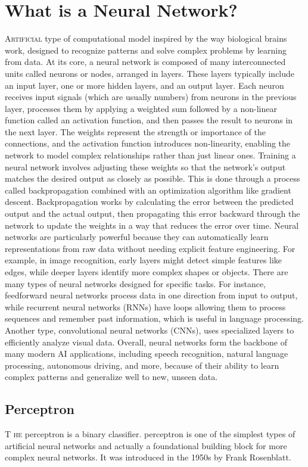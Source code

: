 \documentclass{book}
\begin{document}
\section{What is a Neural Network?}
\lettrine{A}{rtificial} type of computational model inspired by the way biological brains work, designed to recognize patterns and solve complex problems by learning from data. At its core, a neural network is composed of many interconnected units called neurons or nodes, arranged in layers. These layers typically include an input layer, one or more hidden layers, and an output layer.
Each neuron receives input signals (which are usually numbers) from neurons in the previous layer, processes them by applying a weighted sum followed by a non-linear function called an activation function, and then passes the result to neurons in the next layer. The weights represent the strength or importance of the connections, and the activation function introduces non-linearity, enabling the network to model complex relationships rather than just linear ones.
Training a neural network involves adjusting these weights so that the network’s output matches the desired output as closely as possible. This is done through a process called backpropagation combined with an optimization algorithm like gradient descent. Backpropagation works by calculating the error between the predicted output and the actual output, then propagating this error backward through the network to update the weights in a way that reduces the error over time.
Neural networks are particularly powerful because they can automatically learn representations from raw data without needing explicit feature engineering. For example, in image recognition, early layers might detect simple features like edges, while deeper layers identify more complex shapes or objects.
There are many types of neural networks designed for specific tasks. For instance, feedforward neural networks process data in one direction from input to output, while recurrent neural networks (RNNs) have loops allowing them to process sequences and remember past information, which is useful in language processing. Another type, convolutional neural networks (CNNs), uses specialized layers to efficiently analyze visual data.
Overall, neural networks form the backbone of many modern AI applications, including speech recognition, natural language processing, autonomous driving, and more, because of their ability to learn complex patterns and generalize well to new, unseen data.

\subsection{Perceptron}
\lettrine{T}{ he} perceptron is a binary classifier. perceptron is one of the simplest types of artificial neural networks and actually a foundational building block for more complex neural networks. It was introduced in the 1950s by Frank Rosenblatt.
\end{document}
